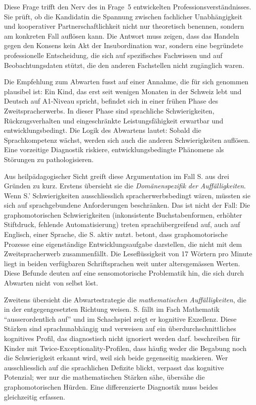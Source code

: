 \documentclass[ngerman, a4paper]{article}
\begin{document}
Diese Frage trifft den Nerv des in Frage~5 entwickelten Professionsverständnisses.
Sie prüft, ob die Kandidatin die Spannung zwischen fachlicher Unabhängigkeit und
kooperativer Partnerschaftlichkeit nicht nur theoretisch benennen, sondern am
konkreten Fall auflösen kann. Die Antwort muss zeigen, dass das Handeln gegen
den Konsens kein Akt der Insubordination war, sondern eine begründete
professionelle Entscheidung, die sich auf spezifisches Fachwissen und auf
Beobachtungsdaten stützt, die den anderen Fachstellen nicht zugänglich waren.

Die Empfehlung zum Abwarten fusst auf einer Annahme, die für sich genommen
plausibel ist: Ein Kind, das erst seit wenigen Monaten in der Schweiz lebt und
Deutsch auf A1-Niveau spricht, befindet sich in einer frühen Phase des
Zweitspracherwerbs. In dieser Phase sind sprachliche Schwierigkeiten,
Rückzugsverhalten und eingeschränkte Leistungsfähigkeit erwartbar und
entwicklungsbedingt. Die Logik des Abwartens lautet: Sobald die Sprachkompetenz
wächst, werden sich auch die anderen Schwierigkeiten auflösen. Eine vorzeitige
Diagnostik riskiere, entwicklungsbedingte Phänomene als Störungen zu
pathologisieren.

Aus heilpädagogischer Sicht greift diese Argumentation im Fall S. aus drei
Gründen zu kurz. Erstens übersieht sie die \textit{Domänenspezifik der
  Auffälligkeiten}. Wenn S.' Schwierigkeiten ausschliesslich spracherwerbsbedingt
wären, müssten sie sich auf sprachgebundene Anforderungen beschränken. Das
ist nicht der Fall: Die graphomotorischen Schwierigkeiten (inkonsistente
Buchstabenformen, erhöhter Stiftdruck, fehlende Automatisierung) treten
sprachübergreifend auf, auch auf Englisch, einer Sprache, die S. aktiv nutzt.
\textcite[S.\,2--4]{sturm2016graphomotorik} betont, dass graphomotorische Prozesse eine eigenständige
Entwicklungsaufgabe darstellen, die nicht mit dem Zweitspracherwerb
zusammenfällt. Die Leseflüssigkeit von 17
Wörtern pro Minute liegt in beiden verfügbaren Schriftsprachen weit unter
altersgemässen Werten. Diese Befunde deuten auf eine sensomotorische
Problematik hin, die sich durch Abwarten nicht von selbst löst.

Zweitens übersieht die Abwartestrategie die \textit{mathematischen
  Auffälligkeiten}, die in der entgegengesetzten Richtung weisen. S. fällt
im Fach Mathematik \enquote{ausserordentlich auf} und im Schachspiel zeigt
er kognitive Exzellenz. Diese Stärken sind sprachunabhängig und verweisen
auf ein überdurchschnittliches kognitives Profil, das diagnostisch nicht
ignoriert werden darf. \textcite[Kap.\,2.2]{preckel2013hochbegabung} beschreiben für Kinder mit
Twice-Exceptionality-Profilen, dass häufig weder die Begabung noch die
Schwierigkeit erkannt wird, weil sich beide gegenseitig maskieren. Wer
ausschliesslich auf die sprachlichen Defizite blickt, verpasst das
kognitive Potenzial; wer nur die mathematischen Stärken sähe, übersähe
die graphomotorischen Hürden. Eine differenzierte Diagnostik muss beides
gleichzeitig erfassen.
\end{document}
